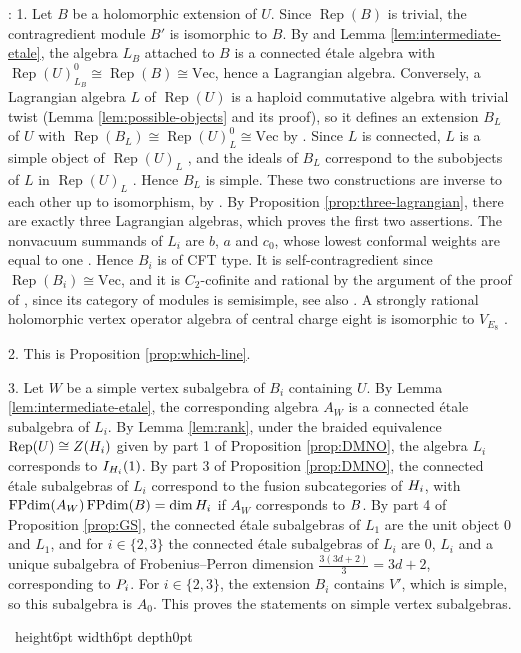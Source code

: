 \documentclass[leqno]{article}
\let\cal\relax
\newcommand{\cal}{\mathcal}
\newcommand{\qed}{\hfill \vrule height6pt  width6pt depth0pt}
\DeclareMathOperator{\Rep}{Rep} %
\newenvironment{proof}[1][]{\noindent {\it Proof #1} : }{\hbox{~}\qed
\smallskip
}
\numberwithin{equation}{section}
\begin{document}
\begin{proof}
1. Let $B$ be a holomorphic extension of $U$. Since $\Rep(B)$ is trivial, the contragredient module $B'$ is isomorphic to $B$. By \cite[Theorems 3.2 and 3.4 pp.~10 and 16]{HKL15} and Lemma \ref{lem:intermediate-etale}, the algebra $L_B$ attached to $B$ is a connected \'etale algebra with $\Rep(U)_{L_B}^0 \cong \Rep(B) \cong \mathrm{Vec}$, hence a Lagrangian algebra. Conversely, a Lagrangian algebra $L$ of $\Rep(U)$ is a haploid commutative algebra with trivial twist (Lemma \ref{lem:possible-objects} and its proof), so it defines an extension $B_L$ of $U$ with $\Rep(B_L) \cong \Rep(U)^0_L \cong \mathrm{Vec}$ by \cite[Theorems 3.2 and 3.4 pp.~10 and 16]{HKL15}. Since $L$ is connected, $L$ is a simple object of $\Rep(U)_L$ \cite[p.~10]{DMNO13}, and the ideals of $B_L$ correspond to the subobjects of $L$ in $\Rep(U)_L$ \cite[proof of Theorem 3.2 p.~10]{HKL15}. Hence $B_L$ is simple. These two constructions are inverse to each other up to isomorphism, by \cite[Theorem 3.2 p.~10]{HKL15}. By Proposition \ref{prop:three-lagrangian}, there are exactly three Lagrangian algebras, which proves the first two assertions. The nonvacuum summands of $L_i$ are $b$, $a$ and $c_0$, whose lowest conformal weights are equal to one \cite[(4.1)]{Arh26}. Hence $B_i$ is of CFT type. It is self-contragredient since $\Rep(B_i) \cong \mathrm{Vec}$, and it is $C_2$-cofinite and rational by the argument of the proof of \cite[Corollary 5.13 p.~53]{CKM22}, since its category of modules is semisimple, see also \cite[proof of Proposition 4.1]{Arh26}. A strongly rational holomorphic vertex operator algebra of central charge eight is isomorphic to $V_{E_8}$ \cite[Theorem 1 p.~2]{DoM04b}.

2. This is Proposition \ref{prop:which-line}.

3. Let $W$ be a simple vertex subalgebra of $B_i$ containing $U$. By Lemma \ref{lem:intermediate-etale}, the corresponding algebra $A_W$ is a connected \'etale subalgebra of $L_i$. By Lemma \ref{lem:rank}, under the braided equivalence $\Rep(U) \cong Z(\cal H_i)$ given by part 1 of Proposition \ref{prop:DMNO}, the algebra $L_i$ corresponds to $I_{\cal H_i}(1)$. By part 3 of Proposition \ref{prop:DMNO}, the connected \'etale subalgebras of $L_i$ correspond to the fusion subcategories of $\cal H_i$, with $\operatorname{FPdim}(A_W)\operatorname{FPdim}(\cal B) = \dim \cal H_i$ if $A_W$ corresponds to $\cal B$. By part 4 of Proposition \ref{prop:GS}, the connected \'etale subalgebras of $L_1$ are the unit object $0$ and $L_1$, and for $i \in \{2,3\}$ the connected \'etale subalgebras of $L_i$ are $0$, $L_i$ and a unique subalgebra of Frobenius--Perron dimension $\frac{3(3d+2)}{3} = 3d+2$, corresponding to $\cal P_i$. For $i \in \{2,3\}$, the extension $B_i$ contains $V'$, which is simple, so this subalgebra is $A_0$. This proves the statements on simple vertex subalgebras.


\end{proof}
\end{document}
